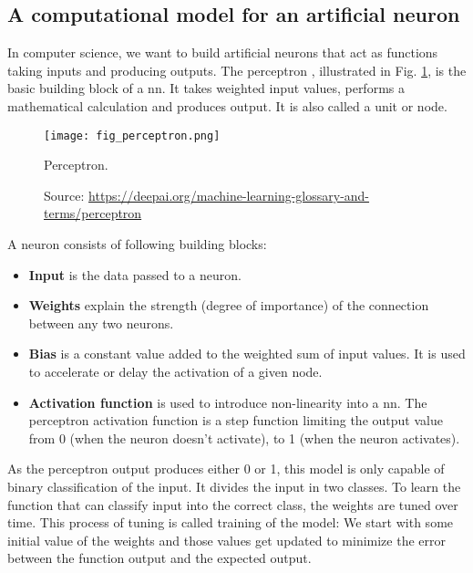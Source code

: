 \subsection{A computational model for an artificial neuron}
In computer science, we want to build artificial neurons that act as functions taking inputs and producing outputs. The perceptron \cite{rosenblatt1958perceptron, minsky2017perceptrons}, illustrated in Fig. \ref{fig:perceptron}, is the basic building block of a \acrfull{nn}. It takes weighted input values, performs a mathematical calculation and produces output. It is also called a unit or node.
\begin{figure}[ht]
    \begin{center}
    \texttt{[image: fig\_perceptron.png]}
    \caption[Perceptron]{Perceptron.}
    \caption*{Source: \href{https://deepai.org/machine-learning-glossary-and-terms/perceptron}{https://deepai.org/machine-learning-glossary-and-terms/perceptron}}
    \label{fig:perceptron}
    \end{center}
\end{figure}
A neuron consists of following building blocks:
\begin{itemize}
    \item \textbf{Input} is the data passed to a neuron.
    \item \textbf{Weights} explain the strength (degree of importance) of the connection between any two neurons.
    \item \textbf{Bias} is a constant value added to the weighted sum of input values. It is used to accelerate or delay the activation of a given node.
    \item \textbf{Activation function} is used to introduce non-linearity into a \acrshort{nn}. The perceptron activation function is a step function limiting the output value from 0 (when the neuron doesn't activate), to 1 (when the neuron activates).
\end{itemize}
As the perceptron output produces either 0 or 1, this model is only capable of binary classification of the input. It divides the input in two classes. To learn the function that can classify input into the correct class, the weights are tuned over time. This process of tuning is called training of the model: We start with some initial value of the weights and those values get updated to minimize the error between the function output and the expected output.

